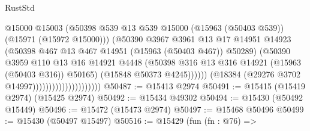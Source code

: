 \begin{lexlean}{RustStd}
\begin{coremodule}
                                                @15000
                                                @15003
                                                (@50398
                                                  @539
                                                  @13
                                                  @539
                                                  @15000
                                                  (@15963 (@50403 @539))
                                                  (@15971 (@15972 @15000)))
                                                (@50390
                                                  @3967
                                                  @3961
                                                  @13
                                                  @17
                                                  @14951
                                                  @14923
                                                  (@50398
                                                    @467
                                                    @13
                                                    @467
                                                    @14951
                                                    (@15963 (@50403 @467))
                                                    @50289)
                                                  (@50390
                                                    @3959
                                                    @110
                                                    @13
                                                    @16
                                                    @14921
                                                    @4448
                                                    (@50398
                                                      @316
                                                      @13
                                                      @316
                                                      @14921
                                                      (@15963 (@50403 @316))
                                                      @50165)
                                                    (@15848 @50373 @4245))))))
                                          (@18384 (@29276 @3702 @14997)))))))))))))))))))))
@50487 := @15413 @2974
@50491 := @15415 (@15419 @2974) (@15425 @2974)
@50492 := @15434 @49302
@50494 := @15430 (@50492 @15449)
@50496 := @15472 (@15473 @2974)
@50497 := @15468 @50496
@50499 := @15430 (@50497 @15497)
@50516 := @15429
    (fun (fn : @76) =>

\end{coremodule}
\end{lexlean}
